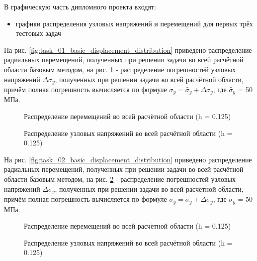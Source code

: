 \documentclass[a4paper, 14pt]{extarticle}
\newcommand{\area}{rectangle}
\newcommand{\task}{3_fixes}
\newcommand{\taskNum}{01}
\begin{document}
В графическую часть дипломного проекта входят:
\begin{itemize}
\item графики распределения узловых напряжений и перемещений для первых трёх тестовых задач
\end{itemize}

\newpage

\renewcommand{\area}{rectangle}
\renewcommand{\task}{3_fixes}
\renewcommand{\taskNum}{01}

На рис. \ref{fig:task_\taskNum_basic_displacement_distribution} приведено распределение радиальных перемещений, полученных при решении задачи во всей расчётной области базовым методом, на рис. \ref{fig:task_\taskNum_basic_pressure_distribution_y} - распределение погрешностей узловых напряжений $\Delta\sigma_y$, полученных при решении задачи во всей расчётной области, причём полная погрешность вычисляется по формуле $\sigma_y = \tilde{\sigma_y} + \Delta \sigma_y$, где $\tilde{\sigma_y}$ = 50 МПа.

\begin{figure}[h]
\caption{Распределение перемещений во всей расчётной области (h = 0.125)}
\label{fig:task_\taskNum_basic_displacement_distribution}
\caption{Распределение узловых напряжений во всей расчётной области (h = 0.125)}
\label{fig:task_\taskNum_basic_pressure_distribution_y}
\end{figure}

\newpage

\renewcommand{\area}{rectangle}
\renewcommand{\task}{2_fixes}
\renewcommand{\taskNum}{02}

На рис. \ref{fig:task_\taskNum_basic_displacement_distribution} приведено распределение радиальных перемещений, полученных при решении задачи во всей расчётной области базовым методом, на рис. \ref{fig:task_\taskNum_basic_pressure_distribution_y} - распределение погрешностей узловых напряжений $\Delta\sigma_y$, полученных при решении задачи во всей расчётной области, причём полная погрешность вычисляется по формуле $\sigma_y = \tilde{\sigma_y} + \Delta \sigma_y$, где $\tilde{\sigma_y}$ = 50 МПа.

\begin{figure}[h]
\caption{Распределение перемещений во всей расчётной области (h = 0.125)}
\label{fig:task_\taskNum_basic_displacement_distribution}
\caption{Распределение узловых напряжений во всей расчётной области (h = 0.125)}
\label{fig:task_\taskNum_basic_pressure_distribution_y}
\end{figure}
\end{document}
